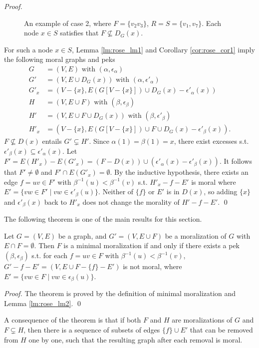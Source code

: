 \begin{proof}
\begin{figure}[H]
\caption{An example of case 2, where $F=\{v_2v_3\}$, $R=S=\{v_1,v_7\}$. Each node $x\in S$ satisfies that $F\nsubseteq D_G(x)$.}
\label{fg:case2}
\end{figure}
For such a node $x \in S$, Lemma \ref{lm:rose_lm1} and Corollary \ref{cor:rose_cor1} imply the following moral graphs and peks
\begin{align*}
G &= (V,E) \text{ with } (\alpha,\epsilon_{\alpha}) \\
G' &=(V,E\cup D_G(x)) \text{ with } (\alpha, \epsilon'_{\alpha}) \\
G'_x&=(V-\{x\}, E(G[V-\{x\}])\cup D_G(x)-\epsilon'_{\alpha}(x))\\
H &= (V,E\cup F) \text{ with } (\beta, \epsilon_{\beta}) \\
H' &=(V,E\cup F \cup D_G(x)) \text{ with } (\beta, \epsilon'_{\beta})\\
H'_x&=(V-\{x\}, E(G[V-\{x\}])\cup F\cup D_G(x)-\epsilon'_{\beta}(x)).
\end{align*}
$F\nsubseteq D(x)$ entails $G' \subsetneq H'$. Since $\alpha(1)=\beta(1)=x$, there exist excesses s.t. $\epsilon'_{\beta}(x) \subseteq \epsilon'_{\alpha}(x)$. Let $F'=E(H'_x)-E(G'_x)=(F-D(x))\cup (\epsilon'_{\alpha}(x)-\epsilon'_{\beta}(x))$. It follows that $F'\neq \emptyset$ and $F' \cap E(G'_x)=\emptyset$. By the inductive hypothesis, there exists an edge $f=uv \in F'$ with $\beta^{-1}(u)<\beta^{-1}(v)$ s.t. $H'_x-f-E'$ is moral where $E'=\{vw \in F' \mid vw \in \epsilon'_{\beta}(u)\}$. Neither of $\{f\}$ or $E'$ is in $D(x)$, so adding $\{x\}$ and $\epsilon'_{\beta}(x)$ back to $H'_x$ does not change the morality of $H'-f-E'$. \qed
\end{proof}

The following theorem is one of the main results for this section. 
\begin{theorem}
Let $G=(V,E)$ be a graph, and $G'=(V,E\cup F)$ be a moralization of $G$ with $E\cap F=\emptyset$. Then $F$ is a minimal moralization if and only if there exists a pek $(\beta,\epsilon_{\beta})$ s.t. for each $f=uv \in F$ with $\beta^{-1}(u) < \beta^{-1}(v)$, $G'-f-E'=(V,E\cup F -\{f\}-E')$ is not moral, where $E'=\{vw \in F \mid vw \in \epsilon_{\beta}(u)\}$.
\end{theorem}
\begin{proof}
The theorem is proved by the definition of minimal moralization and Lemma \ref{lm:rose_lm2}. \qed 
\end{proof}
A consequence of the theorem is that if both $F$ and $H$ are moralizations of $G$ and $F \subsetneq H$, then there is a sequence of subsets of edges $\{f\}\cup E'$ that can be removed from $H$ one by one, such that the resulting graph after each removal is moral. 

